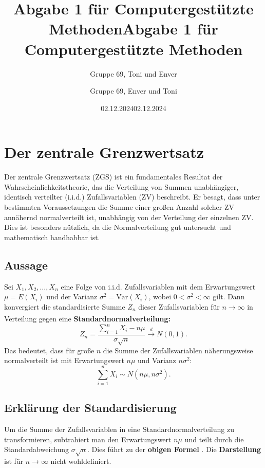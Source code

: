 \documentclass{article}
\title{Abgabe 1 für Computergestützte Methoden}
\author{Gruppe 69, Toni und Enver }
\date{02.12.2024}
\title{Abgabe 1 für Computergestützte Methoden}
\author{Gruppe 69, Enver und Toni}
\date{02.12.2024}
\newcommand{\redboxlink}[2]{\textsuperscript{\hyperlink{#1}{\fbox{\textcolor{red}{#2}}}}}
\begin{document}
\maketitle


\tableofcontents
\newpage


\section{Der zentrale Grenzwertsatz}
\label{sec:zgs}

Der zentrale Grenzwertsatz (ZGS) ist ein fundamentales Resultat der Wahrscheinlichkeitstheorie, das die Verteilung von Summen unabhängiger, identisch verteilter (i.i.d.) Zufallsvariablen (ZV) beschreibt. Er besagt, dass unter bestimmten Voraussetzungen die Summe einer großen Anzahl solcher ZV annähernd normalverteilt ist, unabhängig von der Verteilung der einzelnen ZV. Dies ist besonders nützlich, da die Normalverteilung gut untersucht und mathematisch handhabbar ist.

\subsection{Aussage}
Sei $X_1, X_2, \dots, X_n$ eine Folge von i.i.d. Zufallsvariablen mit dem Erwartungswert $\mu = E(X_i)$ und der Varianz $\sigma^2 = \text{Var}(X_i)$, wobei $0 < \sigma^2 < \infty$ gilt. Dann konvergiert die standardisierte Summe $Z_n$ dieser Zufallsvariablen für $n \to \infty$ in Verteilung gegen eine \textbf{Standardnormalverteilung:}\redboxlink{zgs1}{1} 
\begin{equation}
Z_n = \frac{\sum_{i=1}^n X_i - n\mu}{\sigma \sqrt{n}} \overset{d}{\to} N(0,1). \tag{1}
\end{equation}
Das bedeutet, dass für große $n$ die Summe der Zufallsvariablen näherungsweise normalverteilt ist mit Erwartungswert $n\mu$ und Varianz $n\sigma^2$:
\begin{equation}
\sum_{i=1}^n X_i \sim N(n\mu, n\sigma^2). \tag{2}
\end{equation}

\subsection{Erklärung der Standardisierung}
\label{zgs1}
Um die Summe der Zufallsvariablen in eine Standardnormalverteilung zu transformieren, subtrahiert man den Erwartungswert $n\mu$ und teilt durch die Standardabweichung $\sigma \sqrt{n}$. Dies führt zu der \textbf{obigen Formel} \hyperlink{zgs1}{\fbox{\textcolor{red}{(1)}}}. Die \textbf{Darstellung} \hyperlink{zgs2}{\fbox{\textcolor{red}{(2)}}} ist für $n \to \infty$ nicht wohldefiniert.
\end{document}
